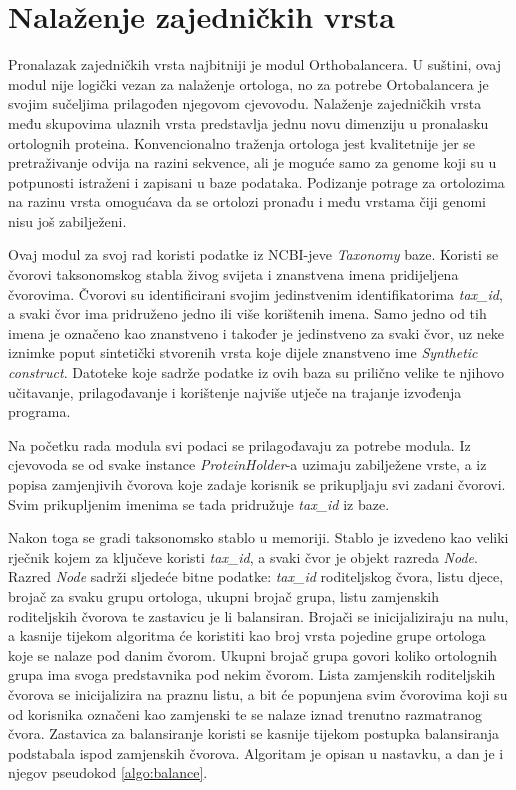\chapter{Nalaženje zajedničkih vrsta}
\setcounter{algorithm}{0} %
\label{chap:tax}

Pronalazak zajedničkih vrsta najbitniji je modul Orthobalancera. U suštini, ovaj
modul nije logički vezan za nalaženje ortologa, no za potrebe Ortobalancera je
svojim sučeljima prilagođen njegovom cjevovodu. Nalaženje zajedničkih vrsta među
skupovima ulaznih vrsta predstavlja jednu novu dimenziju u pronalasku ortolognih
proteina. Konvencionalno traženja ortologa \cite{bharatham2011determinants,
tatusov1997genomic} jest kvalitetnije jer se pretraživanje odvija na razini
sekvence, ali je moguće samo za genome koji su u potpunosti istraženi i zapisani
u baze podataka.\cite{flicek2011ensembl} Podizanje potrage za ortolozima na
razinu vrsta omogućava da se ortolozi pronađu i među vrstama čiji genomi nisu
još zabilježeni.

Ovaj modul za svoj rad koristi podatke iz NCBI-jeve \emph{Taxonomy} baze.
Koristi se čvorovi taksonomskog stabla živog svijeta i znanstvena imena
pridijeljena čvorovima. Čvorovi su identificirani svojim jedinstvenim
identifikatorima \emph{tax\_id}, a svaki čvor ima pridruženo jedno ili više
korištenih imena. Samo jedno od tih imena je označeno kao znanstveno i također
je jedinstveno za svaki čvor, uz neke iznimke poput sintetički stvorenih vrsta
koje dijele znanstveno ime \emph{Synthetic construct}. Datoteke koje sadrže
podatke iz ovih baza su prilično velike te njihovo učitavanje, prilagođavanje i
korištenje najviše utječe na trajanje izvođenja programa.

Na početku rada modula svi podaci se prilagođavaju za potrebe modula. Iz
cjevovoda se od svake instance \emph{ProteinHolder}-a uzimaju zabilježene vrste,
a iz popisa zamjenjivih čvorova koje zadaje korisnik se prikupljaju svi zadani
čvorovi. Svim prikupljenim imenima se tada pridružuje \emph{tax\_id} iz baze.

Nakon toga se gradi taksonomsko stablo u memoriji. Stablo je izvedeno kao veliki
rječnik kojem za ključeve koristi \emph{tax\_id}, a svaki čvor je objekt razreda
\emph{Node}. Razred \emph{Node} sadrži sljedeće bitne podatke: \emph{tax\_id}
roditeljskog čvora, listu djece, brojač za svaku grupu ortologa, ukupni brojač
grupa, listu zamjenskih roditeljskih čvorova te zastavicu je li balansiran.
Brojači se inicijaliziraju na nulu, a kasnije tijekom algoritma će koristiti kao
broj vrsta pojedine grupe ortologa koje se nalaze pod danim čvorom. Ukupni
brojač grupa govori koliko ortolognih grupa ima svoga predstavnika pod nekim
čvorom. Lista zamjenskih roditeljskih čvorova se inicijalizira na praznu listu,
a bit će popunjena svim čvorovima koji su od korisnika označeni kao zamjenski te
se nalaze iznad trenutno razmatranog čvora. Zastavica za balansiranje koristi se
kasnije tijekom postupka balansiranja podstabala ispod zamjenskih čvorova.
Algoritam je opisan u nastavku, a dan je i njegov pseudokod \ref{algo:balance}.

